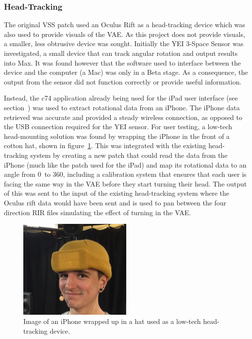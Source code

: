 \documentclass[../../main.tex]{subfiles}
\begin{document}
	\subsubsection{Head-Tracking}

		The original \ac{VSS} patch used an Oculus Rift as a head-tracking device which was also used to provide visuals of the \ac{VAE}. As this project does not provide visuals, a smaller, less obtrusive device was sought. Initially the YEI 3-Space Sensor \cite{YEI} was investigated, a small device that can track angular rotation and output results into Max. It was found however that the software used to interface between the device and the computer (a Mac) was only in a Beta stage. As a consequence, the output from the sensor did not function correctly or provide useful information.

		Instead, the c74 application already being used for the iPad user interface (see section~) was used to extract rotational data from an iPhone. The iPhone data retrieved was accurate and provided a steady wireless connection, as opposed to the USB connection required for the YEI sensor. For user testing, a low-tech head-mounting solution was found by wrapping the iPhone in the front of a cotton hat, shown in figure~\ref{hat}. This was integrated with the existing head-tracking system by creating a new patch that could read the data from the iPhone (much like the patch used for the iPad) and map its rotational data to an angle from 0\textdegree~to 360\textdegree, including a calibration system that ensures that each user is facing the same way in the \ac{VAE} before they start turning their head. The output of this was sent to the input of the existing head-tracking system where the Oculus rift data would have been sent and is used to pan between the four direction \ac{RIR} files simulating the effect of turning in the \ac{VAE}.

		\begin{figure}
			\centerline{\includegraphics[width=0.5\textwidth]{Sections/Implementation/Max/images/Max/Iteration3/hat_edit.JPG}}
			\caption{Image of an iPhone wrapped up in a hat used as a low-tech head-tracking device.}
			\label{hat}
		\end{figure}
\end{document}
